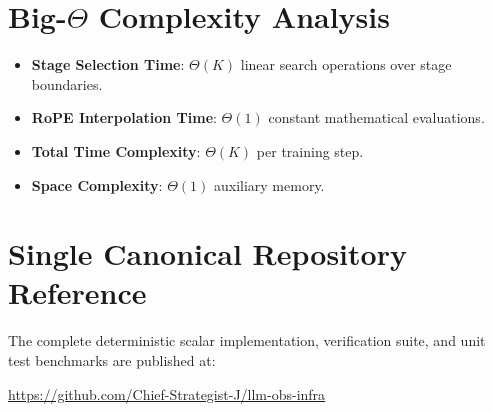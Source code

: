 \documentclass[11pt,a4paper]{article}
\theoremstyle{definition}
\begin{document}
\section{Big-$\Theta$ Complexity Analysis}

\begin{itemize}
    \item \textbf{Stage Selection Time}: $\Theta(K)$ linear search operations over stage boundaries.
    \item \textbf{RoPE Interpolation Time}: $\Theta(1)$ constant mathematical evaluations.
    \item \textbf{Total Time Complexity}: $\Theta(K)$ per training step.
    \item \textbf{Space Complexity}: $\Theta(1)$ auxiliary memory.
\end{itemize}

\section{Single Canonical Repository Reference}

The complete deterministic scalar implementation, verification suite, and unit test benchmarks are published at:
\begin{center}
\url{https://github.com/Chief-Strategist-J/llm-obs-infra}
\end{center}
\end{document}
